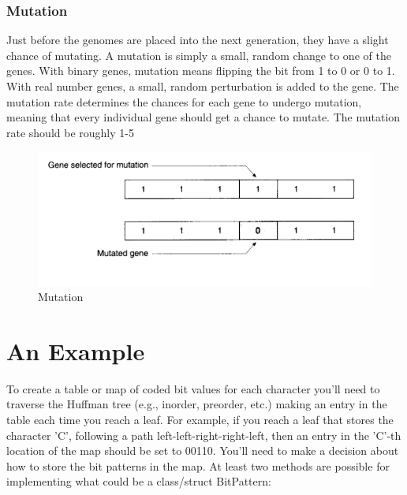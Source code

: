 \documentclass[12pt]{report}
\begin{document}
\subsubsection{Mutation}
Just before the genomes are placed into the next generation, they have a slight chance of mutating. A mutation is simply a small, random change to one of the genes. With binary genes, mutation means flipping the bit from 1 to 0 or 0 to 1. With real number genes, a small, random perturbation is added to the gene. The mutation rate determines the chances for each gene to undergo mutation, meaning that every individual gene should get a chance to mutate. The mutation rate should be roughly 1-5%

\begin{figure}[h!]
	\centering
		\includegraphics[scale=1.0]{mutation.png}
	\caption{Mutation}
	\label{fig:ID3}
\end{figure}


\section{An Example}

To create a table or map of coded bit values for each character you'll need to traverse the Huffman tree (e.g., inorder, preorder, etc.) making an entry in the table each time you reach a leaf. For example, if you reach a leaf that stores the character 'C', following a path left-left-right-right-left, then an entry in the 'C'-th location of the map should be set to 00110. You'll need to make a decision about how to store the bit patterns in the map. At least two methods are possible for implementing what could be a class/struct BitPattern: 
\end{document}
